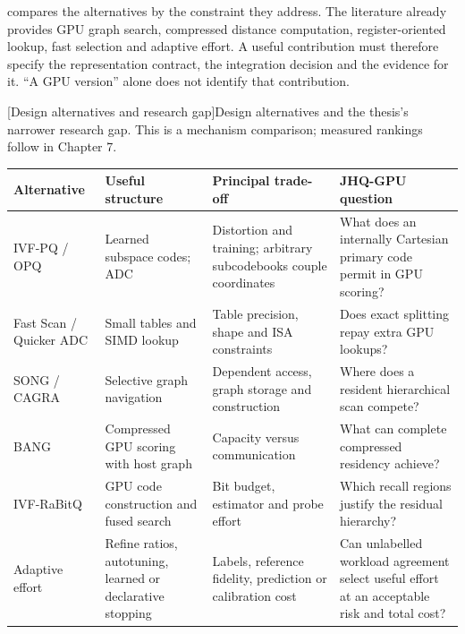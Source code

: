 compares the alternatives by the constraint they
address. The literature already provides GPU graph search, compressed
distance computation, register-oriented lookup, fast selection and adaptive
effort. A useful contribution must therefore specify the representation
contract, the integration decision and the evidence for it. ``A GPU version''
alone does not identify that contribution.

\par\medskip\noindent\begin{minipage}{\linewidth}
\centering\captionsetup{hypcap=false}
[Design alternatives and research gap]{Design alternatives and the thesis's narrower research gap.
This is a mechanism comparison; measured rankings follow in Chapter 7.}
\label{tab:2-position}
\footnotesize\setlength{\tabcolsep}{4pt}
\begin{tabularx}{\linewidth}{@{}>{\raggedright\arraybackslash}p{.20\linewidth}*{3}{>{\raggedright\arraybackslash}X}@{}}
\toprule
Alternative & Useful structure & Principal trade-off & JHQ-GPU question \\
\midrule
IVF-PQ / OPQ & Learned subspace codes; ADC & Distortion and training;
arbitrary subcodebooks couple coordinates & What does an internally
Cartesian primary code permit in GPU scoring? \\
Fast Scan / Quicker ADC & Small tables and SIMD lookup & Table precision,
shape and ISA constraints & Does exact splitting repay extra GPU lookups? \\
SONG / CAGRA & Selective graph navigation & Dependent access, graph
storage and construction & Where does a resident hierarchical scan compete? \\
BANG & Compressed GPU scoring with host graph & Capacity versus
communication & What can complete compressed residency achieve? \\
IVF-RaBitQ & GPU code construction and fused search & Bit budget,
estimator and probe effort & Which recall regions justify the residual hierarchy? \\
Adaptive effort & Refine ratios, autotuning, learned or declarative stopping
& Labels, reference fidelity, prediction or calibration cost & Can unlabelled
workload agreement select useful effort at an acceptable risk and total cost? \\
\bottomrule
\end{tabularx}
\end{minipage}\par\medskip

